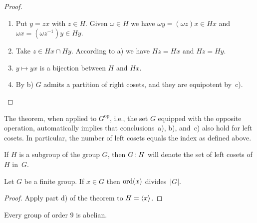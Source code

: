 \begin{proof}${}$

\begin{enumerate}[\upshape a)]
    \item Put $y=zx$ with $z\in H$. Given $\omega\in H$ we have $\omega y = (\omega z)x\in Hx$ and $\omega x = (\omega z^{-1})y\in Hy$.

    \item Take $z\in Hx\cap Hy$. According to a) we have $Hz=Hx$ and $Hz=Hy$.

    \item $y\mapsto yx$ is a bijection between $H$ and $Hx$.

    \item By b) $G$ admits a partition of right cosets, and they are equipotent by~c).
\end{enumerate}
 \end{proof}

\begin{rem}\label{left-index}
    The theorem, when applied to $G^{\textrm{op}}$, i.e., the set $G$ equipped with the opposite operation, automatically implies that conclusions~a), b), and~c) also hold for left cosets. In particular, the number of left cosets equals the index as defined above. 
\end{rem}

\begin{ntn}
    If\/ $H$ is a subgroup of the group\/ $G$, then\/ $G\mathbin:H$ will denote the set of left cosets of\/ $H$ in\/~$G$.
\end{ntn}

\begin{cor}\label{ord(x)-divides-|G|}
    Let $G$ be a finite group. If $x \in G$ then ${\rm ord}(x)$ divides~$|G|$.
\end{cor}

\begin{proof} Apply part d) of the theorem to $H=\langle x\rangle$.  \end{proof}

\begin{xmpl}
    Every group of order $9$ is abelian.
\end{xmpl}

